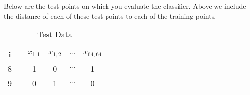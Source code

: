 \begin{EnvFullwidth}
Below are the test points on which you evaluate the classifier. Above we include the distance of each of these test points to each of the training points.

\begin{table}[H]
    \begin{center}
    \begin{tabular}{cccccc}
        \toprule
         i &  & $x_{1,1}$ & $x_{1,2}$ & $\cdots$ & $x_{64,64}$ \\
         \midrule
         8 &  & 1 & 0 & $\cdots$ & 1 \\
         9 &  & 0 & 1 & $\cdots$ & 0 \\
         \bottomrule
    \end{tabular}
    \end{center}
 \caption{Test Data}
 \label{tab:knnimages}
\end{table}

\end{EnvFullwidth}

\clearpage

